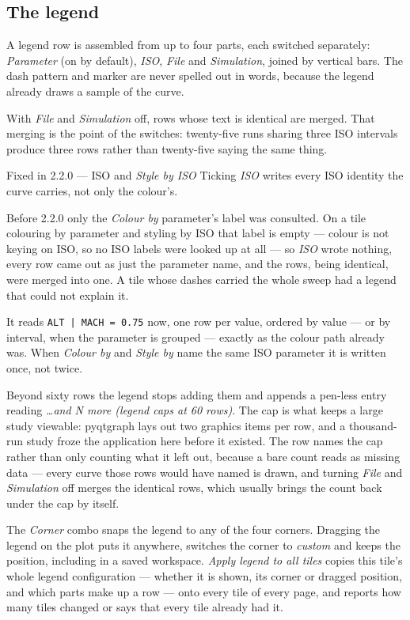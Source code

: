 \documentclass[11pt,a4paper,oneside]{report}
\newcommand{\appver}{2.2.0}
\newcommand{\code}[1]{\texttt{#1}}
\begin{document}
\subsection{The legend}
\label{sec:legend}

A legend row is assembled from up to four parts, each switched separately:
\emph{Parameter} (on by default), \emph{ISO}, \emph{File} and \emph{Simulation},
joined by vertical bars. The dash pattern and marker are never spelled out in
words, because the legend already draws a sample of the curve.

With \emph{File} and \emph{Simulation} off, rows whose text is identical are
merged. That merging is the point of the switches: twenty-five runs sharing three
ISO intervals produce three rows rather than twenty-five saying the same thing.

\begin{aoenew}{Fixed in \appver{} --- ISO and \emph{Style by ISO}}
Ticking \emph{ISO} writes every ISO identity the curve carries, not only the
colour's.

Before \appver{} only the \emph{Colour by} parameter's label was consulted. On a
tile colouring by parameter and styling by ISO that label is empty --- colour is
not keying on ISO, so no ISO labels were looked up at all --- so \emph{ISO} wrote
nothing, every row came out as just the parameter name, and the rows, being
identical, were merged into one. A tile whose dashes carried the whole sweep had
a legend that could not explain it.

It reads \code{ALT | MACH = 0.75} now, one row per value, ordered by value ---
or by interval, when the parameter is grouped --- exactly as the colour path
already was. When \emph{Colour by} and \emph{Style by} name the same ISO
parameter it is written once, not twice.
\end{aoenew}

Beyond sixty rows the legend stops adding them and appends a pen-less entry
reading \emph{\ldots and N more (legend caps at 60 rows)}. The cap is what
keeps a large study viewable: pyqtgraph lays out two graphics items per row, and
a thousand-run study froze the application here before it existed. The row names
the cap rather than only counting what it left out, because a bare count reads
as missing data --- every curve those rows would have named is drawn, and
turning \emph{File} and \emph{Simulation} off merges the identical rows, which
usually brings the count back under the cap by itself.

The \emph{Corner} combo snaps the legend to any of the four corners. Dragging the
legend on the plot puts it anywhere, switches the corner to \emph{custom} and
keeps the position, including in a saved workspace. \emph{Apply legend to all
tiles} copies this tile's whole legend configuration --- whether it is shown, its
corner or dragged position, and which parts make up a row --- onto every tile of
every page, and reports how many tiles changed or says that every tile already
had it.
\end{document}
